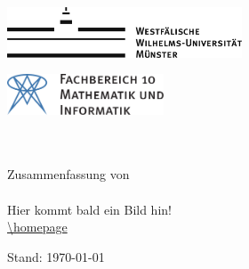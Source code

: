 \begin{titlepage}
\pagestyle{empty}
\begin{center}
\begin{minipage}{0.4\textwidth}
\begin{flushleft}
\includegraphics[height=1.5cm,keepaspectratio]{../!config/wwulogo.pdf}
\end{flushleft}
\end{minipage}
\hfill
\begin{minipage}{0.4\textwidth}
\begin{flushright}
\vspace*{0.3cm}
\includegraphics[height=1.2cm,keepaspectratio]{../!config/fb10logo.pdf} \
\end{flushright}
\end{minipage}

\vspace*{2cm}
\textbf{\Huge{\fach}} \\
\vspace{0.2cm} 
\textbf{{\LARGE \untertitel}} \\
\vspace{0.6cm}
\LARGE{Zusammenfassung von \verfasser} \\
\vspace{0.6cm}
\LARGE{\semester} \\
\vspace*{1.5cm}
Hier kommt bald ein Bild hin! \\
\vspace*{1cm}
\footnotesize{\url{\homepage}} \\

\vfill
\vspace*{1.5cm}
\begin{flushright}
{\footnotesize Stand: \today}
\end{flushright}
\end{center}
\end{titlepage}
